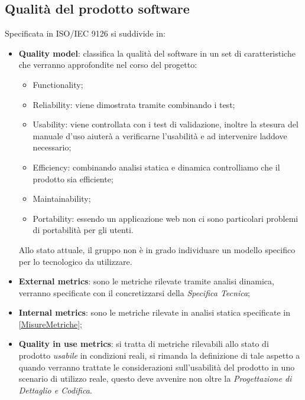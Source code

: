 	\subsection{Qualità del prodotto software}
	Specificata in ISO/IEC 9126 si suddivide in:
	\begin{itemize}
		\item \textbf{Quality model}: classifica la qualità del software in un set di caratteristiche che verranno approfondite nel corso del progetto:
			\begin{itemize}
				\item Functionality;
				\item Reliability: viene dimostrata tramite combinando i test;
				\item Usability: viene controllata con i test di validazione, inoltre la stesura del manuale d'uso aiuterà a verificarne l'usabilità e ad intervenire laddove necessario;
				\item Efficiency: combinando analisi statica e dinamica controlliamo che il prodotto sia efficiente;
				\item Maintainability;
				\item Portability: essendo  un applicazione web non ci sono particolari problemi di portabilità per gli utenti.
			\end{itemize}
			Allo stato attuale, il gruppo non è in grado individuare un modello specifico per lo  tecnologico da utilizzare.
		\item \textbf{External metrics}: sono le metriche rilevate tramite analisi dinamica, verranno specificate con il concretizzarsi della \emph{Specifica Tecnica};
		\item \textbf{Internal metrics}: sono le metriche rilevate in analisi statica specificate in \ref{MisureMetriche};
		\item \textbf{Quality in use metrics}: si tratta di metriche rilevabili allo stato di prodotto \emph{usabile} in condizioni reali, si rimanda la definizione di tale aspetto a quando verranno trattate le considerazioni sull'usabilità del prodotto in uno scenario di utilizzo reale, questo deve avvenire non oltre la \emph{Progettazione di Dettaglio e Codifica}.
	\end{itemize}

